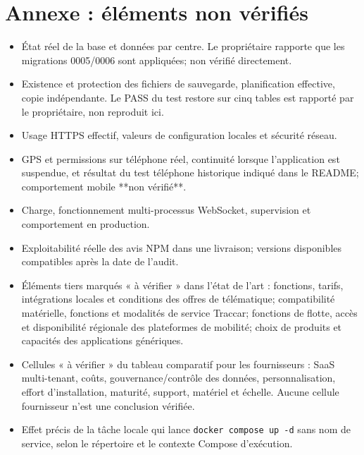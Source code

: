 \documentclass[12pt,a4paper]{article}
\begin{document}
\section{Annexe : éléments non vérifiés}
\begin{itemize}
\item État réel de la base et données par centre. Le propriétaire rapporte que les migrations 0005/0006 sont appliquées; non vérifié directement.
\item Existence et protection des fichiers de sauvegarde, planification effective, copie indépendante. Le PASS du test restore sur cinq tables est rapporté par le propriétaire, non reproduit ici.
\item Usage HTTPS effectif, valeurs de configuration locales et sécurité réseau.
\item GPS et permissions sur téléphone réel, continuité lorsque l'application est suspendue, et résultat du test téléphone historique indiqué dans le README; comportement mobile **non vérifié**.
\item Charge, fonctionnement multi-processus WebSocket, supervision et comportement en production.
\item Exploitabilité réelle des avis NPM dans une livraison; versions disponibles compatibles après la date de l'audit.
\item Éléments tiers marqués « à vérifier » dans l'état de l'art : fonctions, tarifs, intégrations locales et conditions des offres de télématique; compatibilité matérielle, fonctions et modalités de service Traccar; fonctions de flotte, accès et disponibilité régionale des plateformes de mobilité; choix de produits et capacités des applications génériques.
\item Cellules « à vérifier » du tableau comparatif pour les fournisseurs : SaaS multi-tenant, coûts, gouvernance/contrôle des données, personnalisation, effort d'installation, maturité, support, matériel et échelle. Aucune cellule fournisseur n'est une conclusion vérifiée.
\item Effet précis de la tâche locale qui lance \texttt{docker compose up -d} sans nom de service, selon le répertoire et le contexte Compose d'exécution.
\end{itemize}
\end{document}
